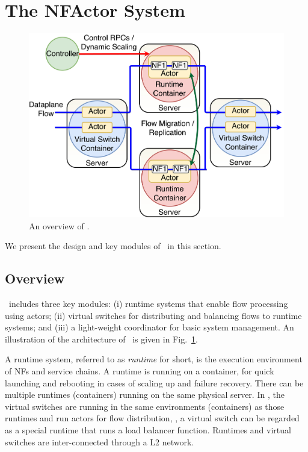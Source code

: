 \section {The NFActor System}

\begin{figure}[!t]
  \centering
  \includegraphics[width=\columnwidth]{figure/new-nfactor-cluster.pdf}
  \caption{An overview of \nfactor.}
  \label{fig:runtime}
\end{figure}

We present the design and key modules of \nfactor~in this section. 

\subsection{Overview}

\nfactor~includes three key modules: (i) runtime systems that enable flow processing using actors; (ii) virtual switches for distributing and balancing flows to runtime systems; and (iii) a light-weight coordinator for basic system management. %
 An illustration of the architecture of \nfactor~is given in Fig.~\ref{fig:runtime}. 
 
A runtime system, referred to as \textit{runtime} for short, is the execution environment of NFs and service chains. A runtime is running on a container, for quick launching and rebooting in cases of scaling up and failure recovery. There can be multiple runtimes (containers) running on the same physical server. In \nfactor, the virtual switches are running in the same environments (containers) as those runtimes and run actors for flow distribution, \ie, a virtual switch can be regarded as a special runtime that runs a load balancer function. Runtimes and virtual switches are inter-connected through a L2 network.
 
